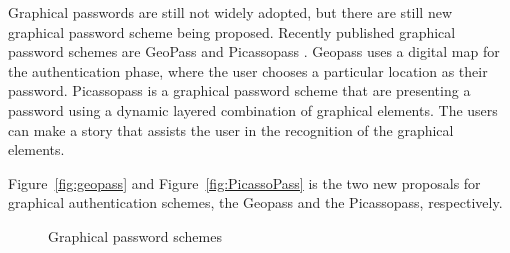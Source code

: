   Graphical passwords are still not widely adopted, but there are still new graphical password scheme being proposed. Recently published graphical password schemes are GeoPass \cite{GeoPass} and Picassopass \cite{PicassoPass}. Geopass uses a digital map for the authentication phase, where the user chooses a particular location as their password. Picassopass is a graphical password scheme that are presenting a password using a dynamic layered combination of graphical elements. The users can make a story that assists the user in the recognition of the graphical elements.

  Figure~\ref{fig:geopass} and Figure~\ref{fig:PicassoPass} is the two new proposals for graphical authentication schemes, the Geopass and the Picassopass, respectively. 

  \begin{figure}[H]
    \centering
    \ContinuedFloat
    \caption{Graphical password schemes}
  \end{figure}

